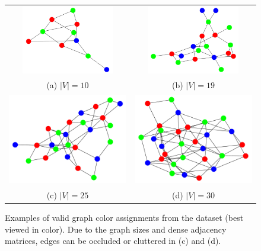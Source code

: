 \begin{figure}[b!]
    \centering
    \setlength{\tabcolsep}{20pt}
    \begin{tabular}{cc}
        \includegraphics[height=3cm]{figures/experiments_figures/dataset_figures/graph_coloring/exmp_tiny_0.pdf} &  \includegraphics[height=3cm]{figures/experiments_figures/dataset_figures/graph_coloring/exmp_tiny_9.pdf}\\
        (a)  $|V|=10$ & (b)  $|V|=19$\\[4pt]
        \includegraphics[height=4cm]{figures/experiments_figures/dataset_figures/graph_coloring/exmp_large_4.pdf} & \includegraphics[height=4cm]{figures/experiments_figures/dataset_figures/graph_coloring/exmp_large_9.pdf}\\
        (c)  $|V|=25$ & (d)  $|V|=30$\\
    \end{tabular}
    \caption[Examples of graph coloring]{Examples of valid graph color assignments from the dataset (best viewed in color). Due to the graph sizes and dense adjacency matrices, edges can be occluded or cluttered in (c) and (d).}
    \label{fig:experiments_graph_coloring_examples}
\end{figure}

